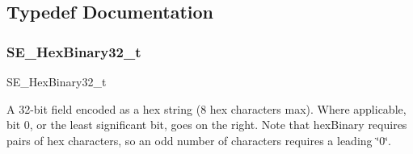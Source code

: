 \subsection{Typedef Documentation}
\mbox{\label{group__HexBinary32_ga062e99a233c4875284116657d048bb98}} 
\subsubsection{\texorpdfstring{S\+E\+\_\+\+Hex\+Binary32\+\_\+t}{SE\_HexBinary32\_t}}
{\footnotesize\ttfamily S\+E\+\_\+\+Hex\+Binary32\+\_\+t}

A 32-\/bit field encoded as a hex string (8 hex characters max). Where applicable, bit 0, or the least significant bit, goes on the right. Note that hex\+Binary requires pairs of hex characters, so an odd number of characters requires a leading \char`\"{}0\char`\"{}. 